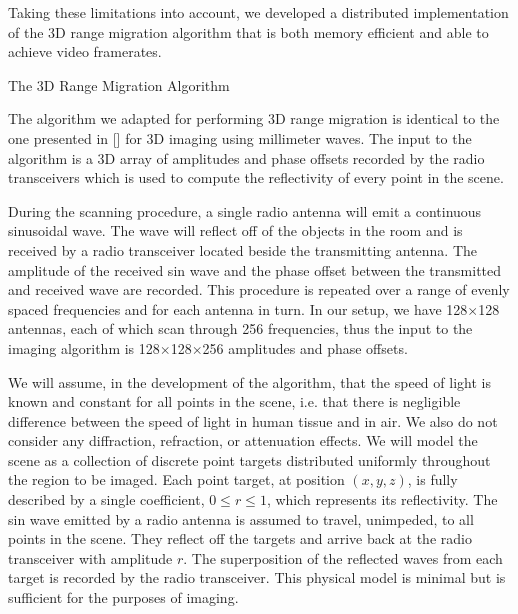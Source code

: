 \documentclass[twocolumn]{article}
\makeatletter
\def\section{\@startsection{section}{1}{\z@}{24pt plus 2 pt
minus 2 pt} {12pt plus 2pt minus 2pt}{\large\bf}}
\makeatother
\begin{document}
Taking these limitations into account, we developed a distributed implementation of the 3D range migration algorithm that is both memory efficient and able to achieve video framerates.

\section{The 3D Range Migration Algorithm}

The algorithm we adapted for performing 3D range migration is identical to the one presented in [] for 3D imaging using millimeter waves. The input to the algorithm is a 3D array of amplitudes and phase offsets recorded by the radio transceivers which is used to compute the reflectivity of every point in the scene. 

During the scanning procedure, a single radio antenna will emit a continuous sinusoidal wave. The wave will reflect off of the objects in the room and is received by a radio transceiver located beside the transmitting antenna. The amplitude of the received sin wave and the phase offset between the transmitted and received wave are recorded. This procedure is repeated over a range of evenly spaced frequencies and for each antenna in turn. In our setup, we have 128$\times$128 antennas, each of which scan through 256 frequencies, thus the input to the imaging algorithm is 128$\times$128$\times$256 amplitudes and phase offsets.

We will assume, in the development of the algorithm, that the speed of light is known and constant for all points in the scene, i.e. that there is negligible difference between the speed of light in human tissue and in air. We also do not consider any diffraction, refraction, or attenuation effects. We will model the scene as a collection of discrete point targets distributed uniformly throughout the region to be imaged. Each point target, at position $(x,y,z)$, is fully described by a single coefficient, $0 \leq r \leq 1$, which represents its reflectivity. The sin wave emitted by a radio antenna is assumed to travel, unimpeded, to all points in the scene. They reflect off the targets and arrive back at the radio transceiver with amplitude $r$. The superposition of the reflected waves from each target is recorded by the radio transceiver. This physical model is minimal but is sufficient for the purposes of imaging.
\end{document}
